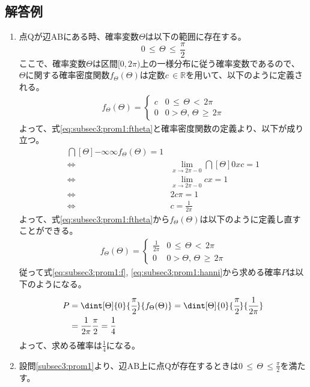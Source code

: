 \documentclass[dvipdfmx,titlepage, 11pt, a4paper]{jsarticle}%
\begin{document}
\subsection{解答例}
\begin{enumerate}[(1)]
    \setlength{\itemsep}{10pt}
    \item 点$\mathrm{Q}$が辺$\mathrm{AB}$にある時、確率変数$\Theta$は以下の範囲に存在する。
    \begin{equation}
        0\, \leq\, \Theta\, \leq\, \frac{\pi}{2}\label{eq:subsec3:prom1:hanni}
    \end{equation}
    ここで、確率変数$\Theta$は区間$[0, 2\pi)$上の一様分布に従う確率変数であるので、
    $\Theta$に関する確率密度関数$f_{\Theta}(\Theta)$は定数$c\, \in \mathbb{R}$を用いて、以下のように定義される。
    \begin{align}
        f_{\Theta}(\Theta) = 
        \begin{cases}
            c & 0\, \leq\, \Theta\, <\, 2\pi\\
            0 & 0 > \Theta,\, \Theta\, \geq\, 2\pi
        \end{cases}\label{eq:subsec3:prom1:ftheta}
    \end{align}
    よって、式\eqref{eq:subsec3:prom1:ftheta}と確率密度関数の定義より、以下が成り立つ。
    \begin{align*}
        \dint[\Theta]{-\infty}{\infty}{f_{\Theta}(\Theta)} = 1\\
        \Longleftrightarrow\; &\lim_{x \to 2\pi-0}\dint[\Theta]{0}{x}{c} = 1\\
        \Longleftrightarrow\; &\lim_{x \to 2\pi-0}cx = 1\\
        \Longleftrightarrow\; &2c\pi = 1\\
        \Longleftrightarrow\; &c = \frac{1}{2\pi}
    \end{align*}
    よって、式\eqref{eq:subsec3:prom1:ftheta}から$f_{\Theta}(\Theta)$は以下のように定義し直すことができる。
    \begin{align}
        f_{\Theta}(\Theta) = 
        \begin{cases}
            \frac{1}{2\pi} & 0\, \leq\, \Theta\, <\, 2\pi\\
            0 & 0 > \Theta,\, \Theta\, \geq\, 2\pi
        \end{cases}\label{eq:subsec3:prom1:f}
    \end{align}
    従って式\eqref{eq:subsec3:prom1:f}, \eqref{eq:subsec3:prom1:hanni}から求める確率$P$は以下のようになる。
    \begin{align*}
        P &= \dint[\Theta]{0}{\cfrac{\pi}{2}}{f_{\Theta}(\Theta)} = \dint[\Theta]{0}{\cfrac{\pi}{2}}{\frac{1}{2\pi}}\\
        &= \frac{1}{2\pi}\frac{\pi}{2} = \frac{1}{4}
    \end{align*}
    よって、求める確率は$\frac{1}{4}$になる。
    \item 設問\eqref{subsec3:prom1}より、辺$\mathrm{AB}$上に点$\mathrm{Q}$が存在するときは$0\, \leq \, \Theta\, \leq \frac{\pi}{2}$を満たす。
   

\end{enumerate}
\end{document}
